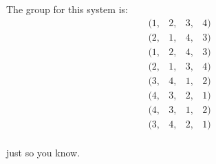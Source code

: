 \documentclass{article}
\begin{document}
The group for this system is:
\begin{equation}
\begin{matrix}
  (1, & 2, & 3, & 4) \\
  (2, & 1, & 4, & 3) \\
  (1, & 2, & 4, & 3) \\
  (2, & 1, & 3, & 4) \\
  (3, & 4, & 1, & 2) \\
  (4, & 3, & 2, & 1) \\
  (4, & 3, & 1, & 2) \\
  (3, & 4, & 2, & 1) \\
\end{matrix}
\end{equation}

just so you know.
\end{document}
